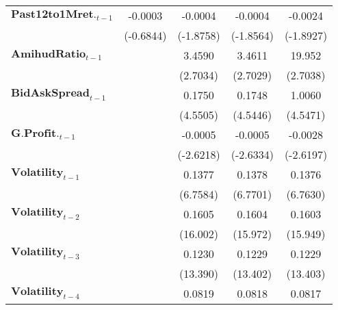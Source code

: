 {\begin{longtable}{>{\bfseries}lcccc}
$\mathbf{Past 12 to 1M ret.}_{t-1}$               &      -0.0003       &            -0.0004            &            -0.0004             &        -0.0024   \\
&     (-0.6844)      &           (-1.8758)           &           (-1.8564)            &       (-1.8927)        \\
$\mathbf{AmihudRatio}_{t-1}$                 &                    &             3.4590            &             3.4611             &         19.952         \\
        &                    &            (2.7034)           &            (2.7029)            &        (2.7038)        \\
$\mathbf{BidAskSpread}_{t-1}$             &                    &             0.1750            &             0.1748             &         1.0060         \\
 &                    &            (4.5505)           &            (4.5446)            &        (4.5471)        \\
$\mathbf{G.Profit.}_{t-1}$          &                    &            -0.0005            &            -0.0005             &        -0.0028         \\
            &                    &           (-2.6218)           &           (-2.6334)            &       (-2.6197)        \\
$\mathbf{Volatility}_{t-1}$                  &                    &             0.1377            &             0.1378             &         0.1376         \\
       &                    &            (6.7584)           &            (6.7701)            &        (6.7630)        \\
$\mathbf{Volatility}_{t-2}$                  &                    &             0.1605            &             0.1604             &         0.1603         \\
                &                    &            (16.002)           &            (15.972)            &        (15.949)        \\
$\mathbf{Volatility}_{t-3}$                  &                    &             0.1230            &             0.1229             &         0.1229         \\
                            &                    &            (13.390)           &            (13.402)            &        (13.403)        \\
$\mathbf{Volatility}_{t-4}$                  &                    &             0.0819            &             0.0818             &         0.0817         \\

\end{longtable}}
